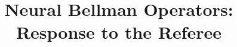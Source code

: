 \documentclass[ecta,draft]{econsocart}
\begin{document}
\begin{frontmatter}
\title{Neural Bellman Operators: Response to the Referee}
\end{frontmatter}

\end{document}
